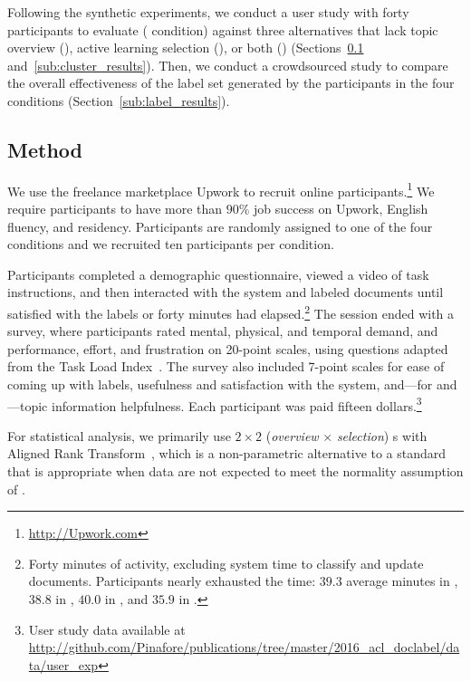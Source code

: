 Following the synthetic experiments, we conduct a user study with
forty participants to evaluate \name{} ( condition) against
three alternatives that lack topic overview (), active
learning selection (), or both () (Sections~\ref{sub:procedures} and~\ref{sub:cluster_results}). Then, we conduct a crowdsourced study to compare the overall effectiveness of the label set generated by the participants in the four conditions (Section~\ref{sub:label_results}).

\subsection{Method}
\label{sub:procedures}

We use the freelance marketplace Upwork to recruit online
participants.\footnote{
\let\hyper@linkurl\saved@hyper@linkurl
\url{http://Upwork.com}\NoHyper} We require participants to have
more than $90\%$ job success on Upwork, English fluency, and 
residency. Participants are randomly assigned to one of the four conditions and
we recruited ten participants per condition.

Participants completed a demographic questionnaire, viewed a video of task
instructions, and then interacted with the system and labeled documents until
satisfied with the labels or forty minutes had elapsed.\footnote{Forty minutes
  of activity, excluding system time to classify and update
  documents. Participants nearly exhausted the time: $39.3$
 average minutes in , $38.8$ in , $40.0$ in , and $35.9$ in
  .} The session ended with a survey, where participants rated mental,
physical, and temporal demand, and performance, effort, and frustration on
20-point scales, using questions adapted from the  Task Load
Index~\cite[]{hart1988development}. The survey also included 7-point
scales for ease of coming up with labels, usefulness and satisfaction with the
system, and---for  and ---topic information helpfulness. Each
participant was paid fifteen dollars.\footnote{User study data available at
\let\hyper@linkurl\saved@hyper@linkurl
  \url{http://github.com/Pinafore/publications/tree/master/2016_acl_doclabel/data/user_exp}
  \NoHyper
  }

For statistical analysis, we primarily use $2\times2$ (\emph{overview} $\times$
\emph{selection}) s with Aligned Rank
Transform~\cite[]{wobbrock2011aligned}, which is a non-parametric
alternative to a standard  that is appropriate when data are not
expected to meet the normality assumption of .
















